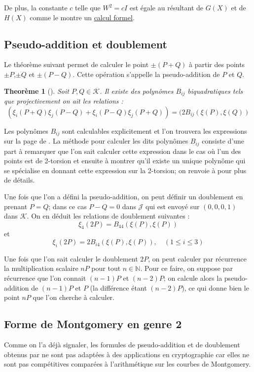 \documentclass[a4paper]{article}
\newtheorem{theoreme}{Theorème}[section]
\theoremstyle{definition}
\theoremstyle{remark}
\numberwithin{equation}{section}
\begin{document}
De plus, la constante $c$ telle que $W^2 = cI$ est égale au résultant de $G(X)$ et de $H(X)$ comme le montre un \href{run:./add2tors.sag}{calcul formel}.

\subsection{Pseudo-addition et doublement}
Le théorème suivant permet de calculer le point $\pm (P+Q)$ à partir des points $\pm P$,$\pm Q$ et $\pm(P-Q)$. Cette opération s'appelle la pseudo-addition de $P$ et $Q$.

\begin{theoreme}[\citet{cassels-Flynn}]
Soit $P,Q \in \mathcal{K}$. Il existe des polynômes $B_{ij}$ biquadratiques tels que projectivement on ait les relations :
$$(\xi_i(P+Q)\xi_j(P-Q) + \xi_i(P-Q)\xi_j(P+Q)) = (2B_{ij}(\xi(P),\xi(Q))$$
\end{theoreme}

Les polynômes $B_{ij}$ sont calculables explicitement et l'on trouvera les expressions sur la page de \citet{biquad}. La méthode pour calculer les dits polynômes $B_{ij}$ consiste d'une part à remarquer que l'on sait calculer cette expression dans le cas où l'un des points est de 2-torsion et ensuite à montrer qu'il existe un unique polynôme qui se spécialise en donnant cette expression sur la 2-torsion; on renvoie à \citet{cassels-Flynn} pour plus de détails.

Une fois que l'on a défini la pseudo-addition, on peut définir un doublement en prenant $P=Q$; dans ce cas $P-Q = 0$ dans $\mathcal{J}$ qui est envoyé sur $(0,0,0,1)$ dans $\mathcal{K}$. On en déduit les relations de doublement suivantes :
$$\xi_4(2P) = B_{44}(\xi(P),\xi(P))$$
et
$$\xi_i(2P) = 2B_{i4}(\xi(P),\xi(P)), \quad (1\leq i \leq 3)$$

Une fois que l'on sait calculer le doublement $2P$, on peut calculer par récurrence la multiplication scalaire $nP$ pour tout $n\in\mathbb{N}$. Pour ce faire, on suppose par récurrence que l'on connait $(n-1)P$ et $(n-2)P$; on calcule alors la pseudo-addition de $(n-1)P$ et $P$ (la différence étant $(n-2)P$), ce qui donne bien le point $nP$ que l'on cherche à calculer.

\subsection{Forme de Montgomery en genre 2}
Comme on l'a déjà signaler, les formules de pseudo-addition et de doublement obtenus par \citet{cassels-Flynn} ne sont pas adaptées à des applications en cryptographie car elles ne sont pas compétitives comparées à l'arithmétique sur les courbes de Montgomery.
\end{document}
